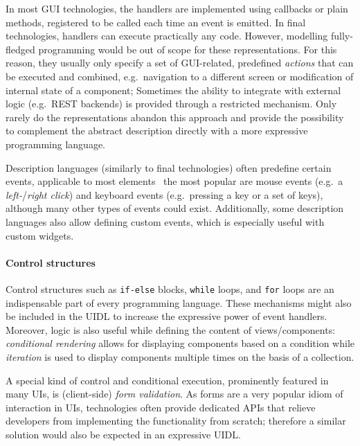 In most GUI technologies, the handlers are implemented using callbacks or plain methods, registered to be called each time an event is emitted.
In final technologies, handlers can execute practically any code.
However, modelling fully-fledged programming would be out of scope for these representations.
For this reason, they usually only specify a set of GUI-related, predefined \emph{actions} that can be executed and combined, e.g.\ navigation to a different screen or modification of internal state of a component;
Sometimes the ability to integrate with external logic (e.g.\ REST backends) is provided through a restricted mechanism.
Only rarely do the representations abandon this approach and provide the possibility to complement the abstract description directly with a more expressive programming language.

Description languages (similarly to final technologies) often predefine certain events, applicable to most elements \textendash\ the most popular are mouse events (e.g.\ a \emph{left-}/\emph{right click}) and keyboard events (e.g.\ pressing a key or a set of keys), although many other types of events could exist.
Additionally, some description languages also allow defining custom events, which is especially useful with custom widgets.

\paragraph{Control structures}
Control structures such as \texttt{if-else} blocks, \texttt{while} loops, and \texttt{for} loops are an indispensable part of every programming language.
These mechanisms might also be included in the UIDL to increase the expressive power of event handlers.
Moreover, logic is also useful while defining the content of views/components: \emph{conditional rendering} allows for displaying components based on a condition while \emph{iteration} is used to display components multiple times on the basis of a collection.

A special kind of control and conditional execution, prominently featured in many UIs, is (client-side) \emph{form validation}.
As forms are a very popular idiom of interaction in UIs, technologies often provide dedicated APIs that relieve developers from implementing the functionality from scratch;
therefore a similar solution would also be expected in an expressive UIDL\@.

